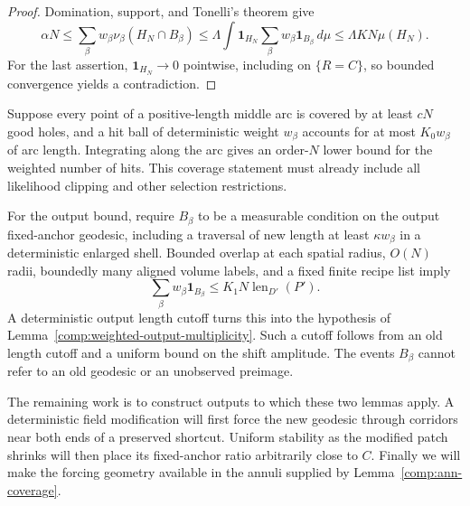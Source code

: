 \begin{proof}
Domination, support, and Tonelli's theorem give
\[
 \alpha N
 \le \sum_\beta w_\beta\nu_\beta(H_N\cap B_\beta)
 \le \Lambda\int\mathbf 1_{H_N}
              \sum_\beta w_\beta\mathbf 1_{B_\beta}\,d\mu
 \le \Lambda K N\mu(H_N).
\]
For the last assertion, $\mathbf 1_{H_N}\to0$ pointwise,
including on $\{R=C\}$, so bounded convergence yields a
contradiction.
\end{proof}

\begin{remark}
\label{comp:counting-checks}
Suppose every point of a positive-length middle arc is covered
by at least $cN$ good holes, and a hit ball of deterministic
weight $w_\beta$ accounts for at most $K_0w_\beta$ of arc
length.  Integrating along the arc gives an order-$N$ lower
bound for the weighted number of hits.  This coverage statement
must already include all likelihood clipping and other
selection restrictions.

For the output bound, require $B_\beta$ to be a measurable
condition on the output fixed-anchor geodesic, including a
traversal of new length at least $\kappa w_\beta$ in a
deterministic enlarged shell.  Bounded overlap at each spatial
radius, $O(N)$ radii, boundedly many aligned volume labels,
and a fixed finite recipe list imply
\[
 \sum_\beta w_\beta\mathbf 1_{B_\beta}
 \le K_1N\operatorname{len}_{D'}(P').
\]
A deterministic output length cutoff turns this into the
hypothesis of Lemma~\ref{comp:weighted-output-multiplicity}.
Such a cutoff follows from an old length cutoff and a uniform
bound on the shift amplitude.  The events $B_\beta$ cannot
refer to an old geodesic or an unobserved preimage.
\end{remark}

The remaining work is to construct outputs to which these two lemmas
apply.  A deterministic field modification will first force the new
geodesic through corridors near both ends of a preserved shortcut.
Uniform stability
as the modified patch shrinks will then place its fixed-anchor ratio
arbitrarily close to $C$.  Finally we will make the forcing geometry
available in the annuli supplied by Lemma~\ref{comp:ann-coverage}.

